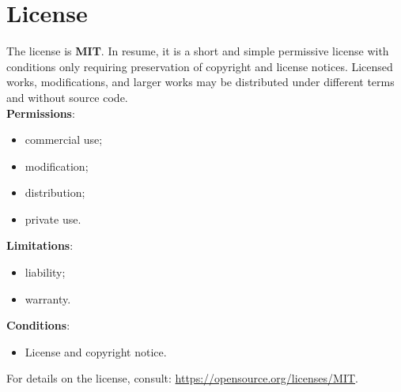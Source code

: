 \section{License}

The license is \textbf{MIT}. In resume, it is a short and simple permissive license with conditions only requiring preservation of copyright and license notices. Licensed works, modifications, and larger works may be distributed under different terms and without source code.\\
\textbf{Permissions}:
\begin{itemize}
	\item commercial use;
	\item modification;
	\item distribution;
	\item private use.
\end{itemize}
\textbf{Limitations}:
\begin{itemize}
	\item liability;
	\item warranty.
\end{itemize}
\textbf{Conditions}:
\begin{itemize}
        \item License and copyright notice.
\end{itemize}
For details on the license, consult: \url{https://opensource.org/licenses/MIT}.
